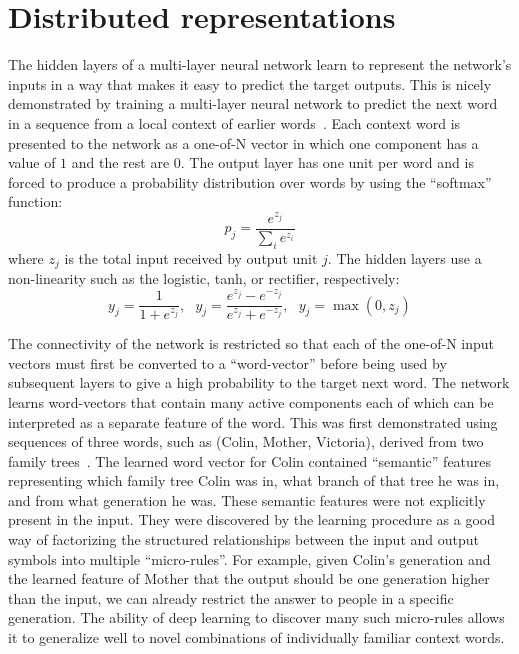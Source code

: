 \documentclass[10pts]{article}
\begin{document}
\section{Distributed representations}

The hidden layers of a multi-layer neural network learn to represent the
network's inputs in a way that makes it easy to predict the target
outputs. This is nicely demonstrated by training a multi-layer neural
network to predict the next word in a sequence from a local context of
earlier words~\citep{BenDucVin01-short}. 
Each context word is presented to the network as a one-of-N
vector in which one component has a value of $1$ and the rest are $0$. The
output layer has one unit per word and is forced to produce a probability
distribution over words by using the ``softmax'' function:
\begin{equation}
p_j = \frac{e^{z_j}}{\sum_i e^{z_i}}
\end{equation}
where $z_j$ is the total input received by output unit $j$. The hidden
layers use a non-linearity such as the logistic, tanh, or rectifier, respectively:
\begin{equation}
y_j = \frac{1}{1+ e^{z_j}}, \ \ \ y_j = \frac{e^{z_j}-e^{-z_j}}{e^{z_j}+e^{-z_j}}, \ \ \
 y_j = \max(0, z_j)
\end{equation}

The connectivity of the network is restricted so that each of the one-of-N
input vectors must first be converted to a ``word-vector'' before being
used by subsequent layers to give a high probability to the target next
word.  The network learns word-vectors that contain many active components
each of which can be interpreted as a separate feature of the word. This
was first demonstrated using sequences of three words, such as
(Colin, Mother, Victoria), derived from two family trees~\citep{RHW}. The learned word
vector for Colin contained ``semantic'' features representing which family
tree Colin was in, what branch of that tree he was in, and from what generation
he was. These semantic features were not explicitly present
in the input.  They were discovered by the learning procedure as a good way
of factorizing the structured relationships between the input and output
symbols into multiple ``micro-rules''.  For example, given Colin's
generation and the learned feature of Mother that the output should be one
generation higher than the input, we can already restrict the answer to
people in a specific generation. The ability of deep learning to discover
many such micro-rules allows it to generalize well to novel combinations of
individually familiar context words.
\end{document}
